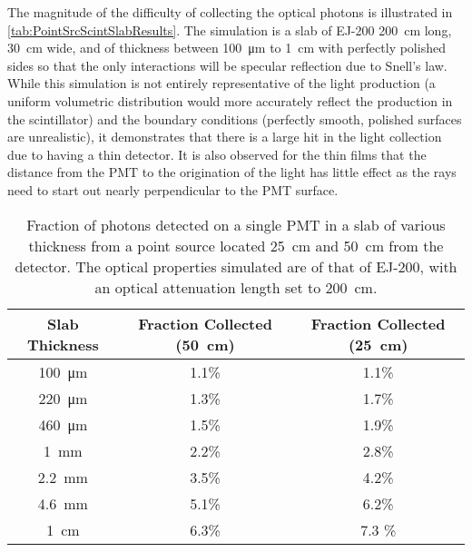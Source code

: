 The magnitude of the difficulty of collecting the optical photons is illustrated in \autoref{tab:PointSrcScintSlabResults}.
The simulation is a slab of EJ-200 \SI{200}{\cm} long, \SI{30}{\cm} wide, and of thickness between \SI{100}{\um} to \SI{1}{\cm} with perfectly polished sides so that the only interactions will be specular reflection due to Snell's law.
While this simulation is not entirely representative of the light production (a uniform volumetric distribution would more accurately reflect the production in the scintillator) and the boundary conditions (perfectly smooth, polished surfaces are unrealistic), it demonstrates that there is a large hit in the light collection due to having a thin detector.
It is also observed for the thin films that the distance from the PMT to the origination of the light has little effect as the rays need to start out nearly perpendicular to the PMT surface.
\begin{table}
	\caption[Fraction of Photons Detected from a Point Source on a single PMT]{Fraction of photons detected on a single PMT in a slab of various thickness from a point source located \SI{25}{\cm} and \SI{50}{\cm} from the detector.  The optical properties simulated are of that of EJ-200, with an optical attenuation length set to \SI{200}{\cm}.}
	\label{tab:PointSrcScintSlabResults}
	\begin{tabular}{c | c  c}
	\toprule
	Slab Thickness & Fraction Collected (\SI{50}{\cm}) & Fraction Collected (\SI{25}{\cm}) \\
	\midrule
	\SI{100}{\um} & 1.1\% & 1.1\% \\
	\SI{220}{\um} & 1.3\% & 1.7\% \\
	\SI{460}{\um} & 1.5\% & 1.9\% \\
	\SI{1}{\mm} & 2.2\% & 2.8\% \\
	\SI{2.2}{\mm} & 3.5\% & 4.2\% \\
	\SI{4.6}{\mm} & 5.1\% & 6.2\% \\
	\SI{1}{\cm} & 6.3\% & 7.3 \% \\
	\bottomrule
	\end{tabular}
\end{table}
